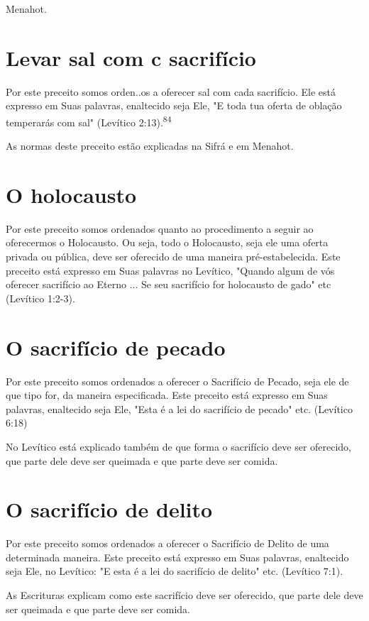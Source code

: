 \begin{itemize}
\begin{enumrate}
\begin{itemize}
\begin{itemize}
Menahot.

\section{Levar sal com c sacrifício}

Por este preceito somos orden..os a oferecer sal com cada sacrifí­cio.
Ele está expresso em Suas palavras, enaltecido seja Ele, "E toda tua
oferta de oblação temperarás com sal" (Levítico
2:13).\textsuperscript{84}


As normas deste preceito estão explicadas na Sifrá e em Menahot.


\section{O holocausto}

Por este preceito somos ordenados quanto ao procedimento a se­guir ao
oferecermos o Holocausto. Ou seja, todo o Holocausto, seja ele uma
oferta privada ou pública, deve ser oferecido de uma maneira
pré-estabelecida. Este preceito está expresso em Suas palavras no
Levítico, "Quando algum de vós oferecer sacrifício ao Eterno ... Se seu
sacrifício for holocausto de gado" etc (Levítico 1:2-3).

\section{O sacrifício de pecado}

Por este preceito somos ordenados a oferecer o Sacrifício de Peca­do,
seja ele de que tipo for, da maneira especificada. Este preceito está
expres­so em Suas palavras, enaltecido seja Ele, "Esta é a lei do
sacrifício de pecado" etc. (Levítico 6:18)

No Levítico está explicado também de que forma o sacrifício deve ser
oferecido, que parte dele deve ser queimada e que parte deve ser comida.

\section{O sacrifício de delito}

Por este preceito somos ordenados a oferecer o Sacrifício de Delito de
uma determinada maneira. Este preceito está expresso em Suas palavras,
enal­tecido seja Ele, no Levítico: "E esta é a lei do sacrifício de
delito" etc. (Leví­tico 7:1).

As Escrituras explicam como este sacrifício deve ser oferecido, que
parte dele deve ser queimada e que parte deve ser comida.


\end{itemize}
\end{itemize}
\end{enumrate}
\end{itemize}
